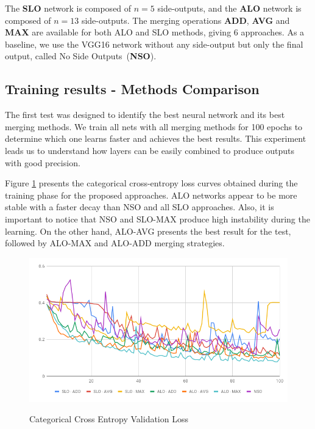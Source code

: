 The \textbf{SLO} network is composed of $n=5$ side-outputs, and the \textbf{ALO} network is composed of $n=13$ side-outputs. 
The merging operations \textbf{ADD}, \textbf{AVG} and \textbf{MAX} are available for both ALO and SLO methods, giving 6 approaches.
As a baseline, we use the VGG16 network without any side-output but only the final output, called No Side Outputs~(\textbf{NSO}).

\subsection{Training results - Methods Comparison}

The first test was designed to identify the best neural network and its best merging methods. We train all nets with all merging methods for 100 epochs to determine which one learns faster and achieves the best results. This experiment leads us to understand how layers can be easily combined to produce outputs with good precision.

Figure \ref{fig:validation_loss} presents the categorical cross-entropy loss curves obtained during the training phase for the proposed approaches. ALO networks appear to be more stable with a faster decay than NSO and all SLO approaches. Also, it is important to notice that NSO and SLO-MAX produce high instability during the learning. On the other hand, ALO-AVG presents the best result for the test, followed by ALO-MAX and ALO-ADD merging strategies.

\begin{figure}
  \caption{Categorical Cross Entropy Validation Loss}
  \centering
    \includegraphics[width=1.\columnwidth]{figures/falreis/validation_loss.png}
  \label{fig:validation_loss}
\end{figure}

